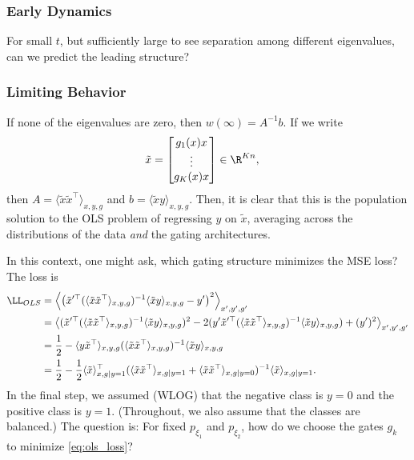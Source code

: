 \documentclass{article}
\begin{document}
\subsubsection{Early Dynamics}
For small $t$, but sufficiently large to see separation among different eigenvalues, can we predict the leading structure?

\subsubsection{Limiting Behavior}
If none of the eigenvalues are zero, then $w(\infty) = A^{-1} b$.
If we write
\begin{align}
  \tilde{x} &= \begin{bmatrix} g_1(x) x \\ \vdots \\ g_K(x) x \end{bmatrix} \in \R^{Kn},
\end{align}
then $A = \langle \tilde{x} \tilde{x}^\top \rangle_{x,y,g}$ and $b = \langle \tilde{x} y \rangle_{x,y,g}$.
Then, it is clear that this is the population solution to the OLS problem of regressing $y$ on $\tilde{x}$, averaging across the distributions of the data \textit{and} the gating architectures.

In this context, one might ask, which gating structure minimizes the MSE loss?
The loss is
\begin{align}
  \LL_{OLS} &= \left\langle \left( \tilde{x}'^\top (\langle \tilde{x} \tilde{x}^\top \rangle_{x,y,g})^{-1} \langle \tilde{x} y \rangle_{x,y,g} - y' \right)^2 \right\rangle_{x',y',g'} \\
  &= \left\langle ( \tilde{x}'^\top (\langle \tilde{x} \tilde{x}^\top \rangle_{x,y,g})^{-1} \langle \tilde{x} y \rangle_{x,y,g} )^2 - 2 ( y' \tilde{x}'^\top (\langle \tilde{x} \tilde{x}^\top \rangle_{x,y,g})^{-1} \langle \tilde{x} y \rangle_{x,y,g} ) + (y')^2 \right\rangle_{x',y',g'} \\
  &= \frac{1}{2} - \langle y \tilde{x}^\top \rangle_{x,y,g} (\langle \tilde{x} \tilde{x}^\top \rangle_{x,y,g})^{-1} \langle \tilde{x} y \rangle_{x,y,g} \\
  &= \frac{1}{2} - \frac{1}{2} \langle \tilde{x} \rangle_{x, g \mid y=1}^\top (\langle \tilde{x} \tilde{x}^\top \rangle_{x, g \mid y=1} + \langle \tilde{x} \tilde{x}^\top \rangle_{x, g \mid y=0})^{-1} \langle \tilde{x} \rangle_{x, g \mid y=1}. \label{eq:ols_loss}
\end{align}
In the final step, we assumed (WLOG) that the negative class is $y=0$ and the positive class is $y=1$.
(Throughout, we also assume that the classes are balanced.)
The question is: For fixed $p_{\xi_1}$ and $p_{\xi_2}$, how do we choose the gates $g_k$ to minimize \cref{eq:ols_loss}?
\end{document}
